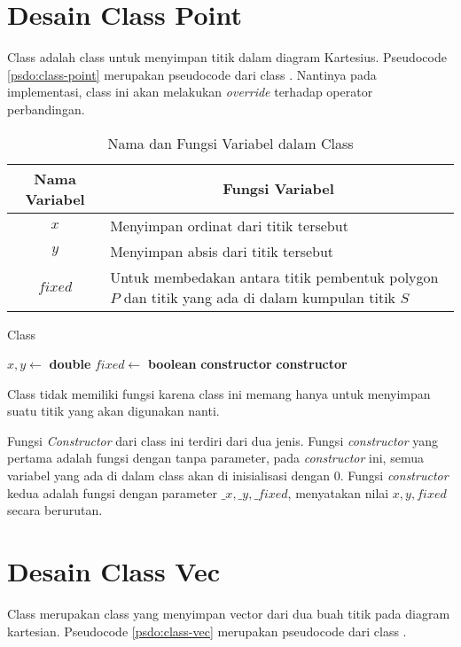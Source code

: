 \section{ Desain Class Point}
\label{sec:point}
Class  adalah class untuk menyimpan titik dalam diagram Kartesius. Pseudocode \ref{psdo:class-point} merupakan pseudocode dari class . Nantinya pada implementasi, class ini akan melakukan \textit{override} terhadap operator perbandingan.
\begin{table}[htb]
	\Centering
	\caption{Nama dan Fungsi Variabel dalam Class }
	\begin{tabular}{|c|p{7cm}|}
	\hline
	Nama Variabel & \multicolumn{1}{c|}{Fungsi Variabel}                               \\ \hline
$x$           & Menyimpan ordinat dari titik tersebut  \\ \hline
$y$           & Menyimpan absis dari titik tersebut          \\ \hline
$fixed$             & Untuk membedakan antara titik pembentuk polygon $P$ dan titik yang ada di dalam kumpulan titik $S$   \\ \hline
	\end{tabular}
	\label{tab:var-point}
\end{table}
\begin{algorithm}
	\caption{Class }
	\label{psdo:class-point}
	\begin{algorithmic}[1]
        \State $ x, y \leftarrow $ \textbf{double}
        \State $fixed \leftarrow $ \textbf{boolean}
		\State \textbf{constructor} 
        \State \textbf{constructor} 
	\end{algorithmic}
\end{algorithm}

Class  tidak memiliki fungsi karena class ini memang hanya untuk menyimpan suatu titik yang akan digunakan nanti.

Fungsi \textit{Constructor} dari class ini terdiri dari dua jenis. Fungsi \textit{constructor} yang pertama adalah fungsi dengan tanpa parameter, pada \textit{constructor} ini, semua variabel yang ada di dalam class  akan di inisialisasi dengan $0$. Fungsi \textit{constructor} kedua adalah fungsi dengan parameter $\_x, \_y, \_fixed$, menyatakan nilai $x, y, fixed$ secara berurutan.

\section{ Desain Class Vec}
\label{sec:vec}
Class  merupakan class yang menyimpan vector dari dua buah titik pada diagram kartesian. Pseudocode \ref{psdo:class-vec} merupakan pseudocode dari class . 

